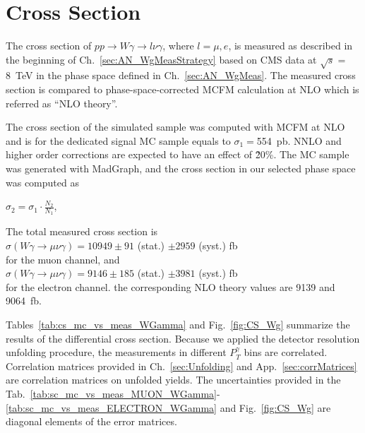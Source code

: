 \section{Cross Section}
\label{sec:AN_CrossSection}

The cross section of $pp\rightarrow W\gamma \rightarrow l\nu\gamma$, where $l=\mu,e$, is measured as described in the beginning of Ch.~\ref{sec:AN_WgMeasStrategy} based on CMS data at $\sqrt{s}=$8~TeV in the phase space defined in  Ch.~\ref{sec:AN_WgMeas}. The measured cross section is compared to phase-space-corrected MCFM calculation at NLO which is referred as ``NLO theory''.  

The cross section of the simulated sample was computed with MCFM at NLO and is for the dedicated signal MC sample equals to $\sigma_1=$554~pb. NNLO and higher order corrections are expected to have an effect of \~20\%. The MC sample was generated with MadGraph, and the cross section in our selected phase space was computed as 

\begin{center}
$\sigma_2 = \sigma_1 \cdot \frac{N_2}{N_1}$, 
\end{center} 



The total measured cross section is \\
$\sigma(W\gamma\rightarrow\mu\nu\gamma)=10949 \pm 91$ (stat.) $ \pm 2959$ (syst.) fb\\
for the muon channel, and \\
$\sigma(W\gamma\rightarrow\mu\nu\gamma)=9146 \pm 185$ (stat.) $ \pm 3981$ (syst.) fb\\
for the electron channel. the corresponding NLO theory values are 9139 and 9064~fb.


Tables~\ref{tab:cs_mc_vs_meas_WGamma} and Fig.~\ref{fig:CS_Wg} summarize the results of the differential cross section. Because we applied the detector resolution unfolding procedure, the measurements in different $P_T^{\gamma}$ bins are correlated. Correlation matrices provided in Ch.~\ref{sec:Unfolding} and App.~\ref{sec:corrMatrices} are correlation matrices on unfolded yields. The uncertainties provided in the Tab.~\ref{tab:sc_mc_vs_meas_MUON_WGamma}-\ref{tab:sc_mc_vs_meas_ELECTRON_WGamma} and Fig.~\ref{fig:CS_Wg} are diagonal elements of the error matrices.


